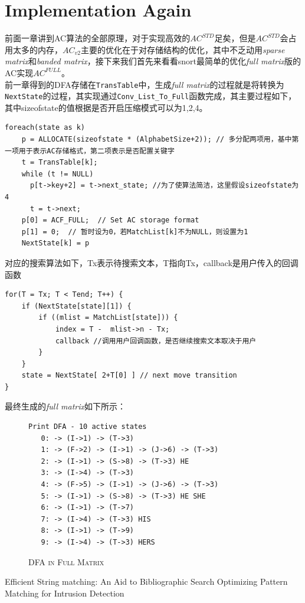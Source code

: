 \documentclass{article}
\begin{document}
\section{Implementation Again}
前面一章讲到AC算法的全部原理，对于实现高效的$AC^{STD}$足矣，但是$AC^{STD}$会占用太多的内存，$AC_{v2}$主要的优化在于对存储结构的优化，其中不乏动用\textit{sparse matrix}和\textit{banded matrix}，接下来我们首先来看看snort最简单的优化\textit{full matrix}版的AC实现$AC^{FULL}$。\\
前一章得到的DFA存储在\lstinline|TransTable|中，生成\textit{full matrix}的过程就是将转换为\lstinline|NextState|的过程，其实现通过\lstinline|Conv_List_To_Full|函数完成，其主要过程如下，其中sizeofstate的值根据是否开启压缩模式可以为1,2,4。
\begin{lstlisting}
foreach(state as k)
    p = ALLOCATE(sizeofstate * (AlphabetSize+2)); // 多分配两项用，基中第一项用于表示AC存储格式，第二项表示是否配置关键字
    t = TransTable[k];
    while (t != NULL)
      p[t->key+2] = t->next_state; //为了使算法简洁，这里假设sizeofstate为4
      t = t->next;
    p[0] = ACF_FULL;  // Set AC storage format
    p[1] = 0;  // 暂时设为0，若MatchList[k]不为NULL，则设置为1
    NextState[k] = p
\end{lstlisting}
对应的搜索算法如下，Tx表示待搜索文本，T指向Tx，callback是用户传入的回调函数
\begin{lstlisting}
for(T = Tx; T < Tend; T++) {
    if (NextState[state][1]) {
        if ((mlist = MatchList[state])) {
            index = T -  mlist->n - Tx;
            callback //调用用户回调函数，是否继续搜索文本取决于用户
        }
    }
    state = NextState[ 2+T[0] ] // next move transition
}
\end{lstlisting}
最终生成的\textit{full matrix}如下所示：
\begin{figure}[h]
  \centering
\caption{\textsc{DFA in Full Matrix}}
\begin{verbatim}
Print DFA - 10 active states
   0: -> (I->1) -> (T->3)
   1: -> (F->2) -> (I->1) -> (J->6) -> (T->3)
   2: -> (I->1) -> (S->8) -> (T->3) HE
   3: -> (I->4) -> (T->3)
   4: -> (F->5) -> (I->1) -> (J->6) -> (T->3)
   5: -> (I->1) -> (S->8) -> (T->3) HE SHE
   6: -> (I->1) -> (T->7)
   7: -> (I->4) -> (T->3) HIS
   8: -> (I->1) -> (T->9)
   9: -> (I->4) -> (T->3) HERS
\end{verbatim}
\end{figure}


\begin{thebibliography}{99}
 Efficient String matching: An Aid to Bibliographic Search
 Optimizing Pattern Matching for Intrusion Detection
\end{thebibliography}
\end{document}
